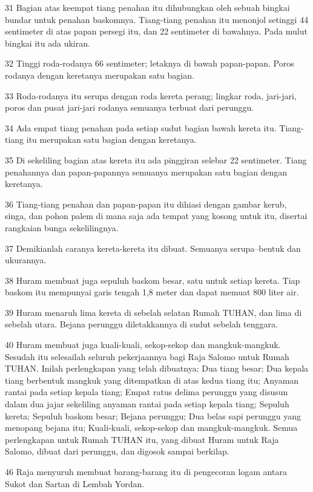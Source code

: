 \par 31 Bagian atas keempat tiang penahan itu dihubungkan oleh sebuah bingkai bundar untuk penahan baskomnya. Tiang-tiang penahan itu menonjol setinggi 44 sentimeter di atas papan persegi itu, dan 22 sentimeter di bawahnya. Pada mulut bingkai itu ada ukiran.
\par 32 Tinggi roda-rodanya 66 sentimeter; letaknya di bawah papan-papan. Poros rodanya dengan keretanya merupakan satu bagian.
\par 33 Roda-rodanya itu serupa dengan roda kereta perang; lingkar roda, jari-jari, poros dan pusat jari-jari rodanya semuanya terbuat dari perunggu.
\par 34 Ada empat tiang penahan pada setiap sudut bagian bawah kereta itu. Tiang-tiang itu merupakan satu bagian dengan keretanya.
\par 35 Di sekeliling bagian atas kereta itu ada pinggiran selebar 22 sentimeter. Tiang penahannya dan papan-papannya semuanya merupakan satu bagian dengan keretanya.
\par 36 Tiang-tiang penahan dan papan-papan itu dihiasi dengan gambar kerub, singa, dan pohon palem di mana saja ada tempat yang kosong untuk itu, disertai rangkaian bunga sekelilingnya.
\par 37 Demikianlah caranya kereta-kereta itu dibuat. Semuanya serupa--bentuk dan ukurannya.
\par 38 Huram membuat juga sepuluh baskom besar, satu untuk setiap kereta. Tiap baskom itu mempunyai garis tengah 1,8 meter dan dapat memuat 800 liter air.
\par 39 Huram menaruh lima kereta di sebelah selatan Rumah TUHAN, dan lima di sebelah utara. Bejana perunggu diletakkannya di sudut sebelah tenggara.
\par 40 Huram membuat juga kuali-kuali, sekop-sekop dan mangkuk-mangkuk. Sesudah itu selesailah seluruh pekerjaannya bagi Raja Salomo untuk Rumah TUHAN. Inilah perlengkapan yang telah dibuatnya: Dua tiang besar; Dua kepala tiang berbentuk mangkuk yang ditempatkan di atas kedua tiang itu; Anyaman rantai pada setiap kepala tiang; Empat ratus delima perunggu yang disusun dalam dua jajar sekeliling anyaman rantai pada setiap kepala tiang; Sepuluh kereta; Sepuluh baskom besar; Bejana perunggu; Dua belas sapi perunggu yang menopang bejana itu; Kuali-kuali, sekop-sekop dan mangkuk-mangkuk. Semua perlengkapan untuk Rumah TUHAN itu, yang dibuat Huram untuk Raja Salomo, dibuat dari perunggu, dan digosok sampai berkilap.
\par 46 Raja menyuruh membuat barang-barang itu di pengecoran logam antara Sukot dan Sartan di Lembah Yordan.
